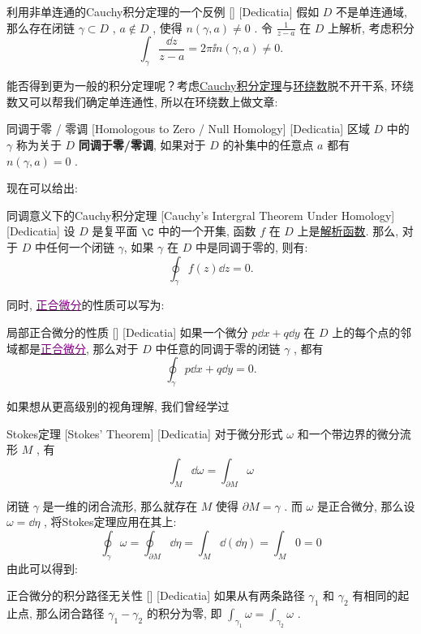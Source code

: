 \documentclass[UTF8]{ctexart}
\newcommand{\hyperrefc}[2]{\hyperref[#1]{\textcolor{purple}{#2}}}
\newcommand{\AnalyticalFunction}{\hyperref[dfn:AnalyticalFunction]{解析函数}}
\newcommand{\CauchyThm}{\hyperref[thm:Cauchy]{Cauchy积分定理}}
\begin{document}
\begin{cxmp}
    [UUID]
    {利用非单连通的Cauchy积分定理的一个反例}
    []
    [Dedicatia]
    假如 \( D \) 不是单连通域, 那么存在闭链 \( \gamma\subset D \) ,  \( a\notin D \) , 使得 \( n(\gamma,a)\neq 0 \) . 令 \( \frac{1}{z-a} \) 在 \( D \) 上解析, 考虑积分
    \[\int_\gamma\frac{\dd{z}}{z-a}=2\pi\ii n(\gamma,a)\neq 0.\]
\end{cxmp}
能否得到更为一般的积分定理呢？考虑\CauchyThm 与\hyperref[dfn:WindingNumber]{环绕数}脱不开干系, 环绕数又可以帮我们确定单连通性, 所以在环绕数上做文章: 
\begin{dfn}
    [NullHomologous]
    {同调于零 / 零调}
    [Homologous to Zero / Null Homology]
    [Dedicatia]
    区域 \( D \) 中的 \( \gamma \) 称为关于 \( D \) \textbf{同调于零/零调}, 如果对于 \( D \) 的补集中的任意点 \( a \) 都有 \( n(\gamma,a)=0 \) .
\end{dfn}
现在可以给出: 
\begin{thm}
    [UUID]
    {同调意义下的Cauchy积分定理}
    [Cauchy's Intergral Theorem Under Homology]
    [Dedicatia]
    设 \(D\) 是复平面 \(\C\) 中的一个开集, 函数 \(f\) 在 \(D\) 上是\AnalyticalFunction . 那么, 对于 \( D \) 中任何一个闭链 \( \gamma \), 如果 \( \gamma \) 在 \( D \) 中是同调于零的, 则有: 
    \[\oint_{\gamma} f(z) \dd z = 0.\]
\end{thm}
同时, \hyperrefc{dfn:ExactDifferential}{正合微分}的性质可以写为: 
\begin{ppt}
    [UUID]
    {局部正合微分的性质}
    []
    [Dedicatia]
    如果一个微分 \( p\dd{x}+q\dd{y} \) 在 \( D \) 上的每个点的邻域都是\hyperrefc{dfn:ExactDifferential}{正合微分}, 那么对于 \( D \) 中任意的同调于零的闭链 \( \gamma \) , 都有
    \[\oint_\gamma p\dd{x}+q\dd{y}=0.\]
\end{ppt}
如果想从更高级别的视角理解, 我们曾经学过
\begin{thm}
    [UUID]
    {Stokes定理}
    [Stokes' Theorem]
    [Dedicatia]
    对于微分形式 \( \omega \) 和一个带边界的微分流形 \( M \) , 有
    \[\int_{M} \dd\omega = \int_{\partial M} \omega\]
\end{thm}
闭链 \( \gamma \) 是一维的闭合流形, 那么就存在 \( M \) 使得 \( \partial M=\gamma \) . 而 \( \omega \) 是正合微分, 那么设 \( \omega=\dd{\eta} \) , 将Stokes定理应用在其上: 
\[\oint_{\gamma} \omega = \oint_{\partial M} \dd\eta = \int_{M} \dd(\dd\eta) = \int_{M} 0 = 0\]
由此可以得到: 
\begin{ppt}
    [UUID]
    {正合微分的积分路径无关性}
    []
    [Dedicatia]
    如果从有两条路径  \( \gamma_1 \)  和  \( \gamma_2 \) 有相同的起止点, 那么闭合路径  \( \gamma_1 - \gamma_2 \)  的积分为零, 即  \( \int_{\gamma_1} \omega = \int_{\gamma_2} \omega \) . 
\end{ppt}
\end{document}
